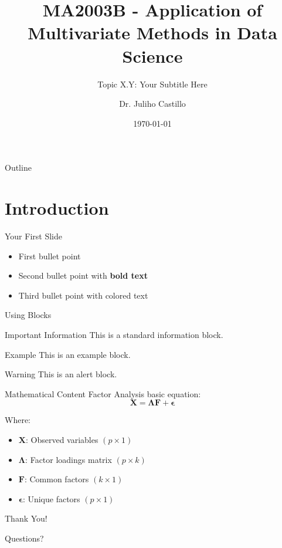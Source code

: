 \documentclass[aspectratio=169]{beamer}
\title[Short Title]{MA2003B - Application of Multivariate Methods in Data Science}
\subtitle{Topic X.Y: Your Subtitle Here}
\author{Dr. Juliho Castillo}
\institute{Tec de Monterrey}
\date{\today}
\begin{document}
\begin{frame}
  \titlepage
\end{frame}

\begin{frame}{Outline}
  \tableofcontents
\end{frame}

\section{Introduction}

\begin{frame}{Your First Slide}
  \begin{itemize}
    \item First bullet point
    \item Second bullet point with \textbf{bold text}
    \item Third bullet point with \textcolor{tecorange}{colored text}
  \end{itemize}
\end{frame}

\begin{frame}{Using Blocks}
  \begin{block}{Important Information}
    This is a standard information block.
  \end{block}
  
  \begin{exampleblock}{Example}
    This is an example block.
  \end{exampleblock}
  
  \begin{alertblock}{Warning}
    This is an alert block.
  \end{alertblock}
\end{frame}

\begin{frame}{Mathematical Content}
  Factor Analysis basic equation:
  $$\mathbf{X} = \mathbf{\Lambda F} + \mathbf{\epsilon}$$
  
  Where:
  \begin{itemize}
    \item $\mathbf{X}$: Observed variables $(p \times 1)$
    \item $\mathbf{\Lambda}$: Factor loadings matrix $(p \times k)$
    \item $\mathbf{F}$: Common factors $(k \times 1)$
    \item $\mathbf{\epsilon}$: Unique factors $(p \times 1)$
  \end{itemize}
\end{frame}

\begin{frame}
  \centering
  \Huge Thank You!
  
  \normalsize Questions?
\end{frame}
\end{document}
